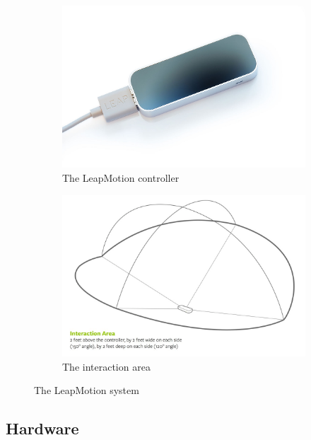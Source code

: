 \documentclass[12pt,a4paper,twoside]{report}
\begin{document}
\begin{figure}[h]
  \centering
  \begin{subfigure}{0.45\textwidth}
    \includegraphics[width=\linewidth]{img/Leap_motion.jpg}
    \caption[]{The LeapMotion controller \footnotemark[1]}
    \label{fig:leap_controller}
  \end{subfigure}
  \begin{subfigure}{0.45\textwidth}
    \includegraphics[width=\linewidth]{img/Leap_interaction.png}
    \caption[]{The interaction area \footnotemark[2]}
    \label{fig:leap_interaction}
  \end{subfigure}
  \caption{The LeapMotion system}
\end{figure}

\subsection{Hardware}
\end{document}
